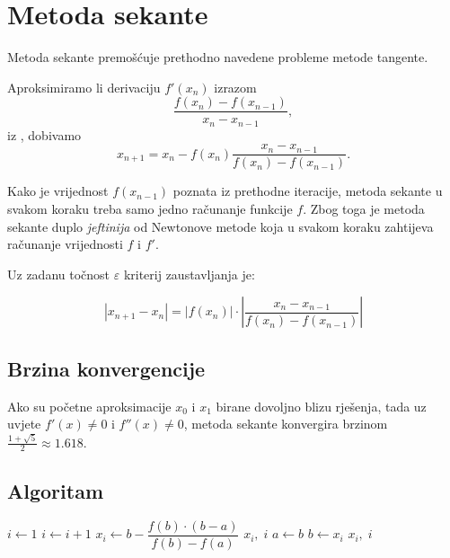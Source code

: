 \section{Metoda sekante}

Metoda sekante premošćuje prethodno navedene probleme metode tangente.

Aproksimiramo li derivaciju $f'(x_n)$ izrazom
$$
\dfrac{f(x_n)-f(x_{n-1})}{x_n - x_{n-1}},
$$
iz , dobivamo
$$
x_{n+1} = x_n - f(x_n)\dfrac{x_n-x_{n-1}}{f(x_n)-f(x_{n-1})}.
$$

Kako je vrijednost $f(x_{n-1})$ poznata iz prethodne iteracije, metoda sekante u
svakom koraku treba samo jedno računanje funkcije $f$. Zbog toga je metoda
sekante duplo \textit{jeftinija} od Newtonove metode koja u svakom koraku
zahtijeva računanje vrijednosti $f$ i $f'$.

Uz zadanu točnost $\varepsilon$ kriterij zaustavljanja je:

$$
|x_{n+1}-x_n| = |f(x_n)|\cdot\left|\frac{x_n-x_{n-1}}{f(x_n)-f(x_{n-1})}\right|
$$

\subsection{Brzina konvergencije}

Ako su početne aproksimacije $x_0$ i $x_1$ birane dovoljno blizu rješenja, tada
uz uvjete $f'(x)\neq 0$ i $f''(x)\neq 0$, metoda sekante konvergira brzinom
$\frac{1+\sqrt{5}}{2}\approx 1.618$.

\subsection{Algoritam}

\begin{algorithmic}
    \State $i \gets 1$
        \State $i \gets i + 1$
        \State $x_i \gets b - \dfrac{f(b) \cdot (b - a)}{f(b) - f(a)}$
            \State \Return $x_i,\;i$ 
        \Else
            \State $a \gets b$
            \State $b \gets x_i$
        \EndIf
        \EndIf
    \EndWhile
    \State \Return $x_i,\;i$
\EndFunction
\end{algorithmic}
